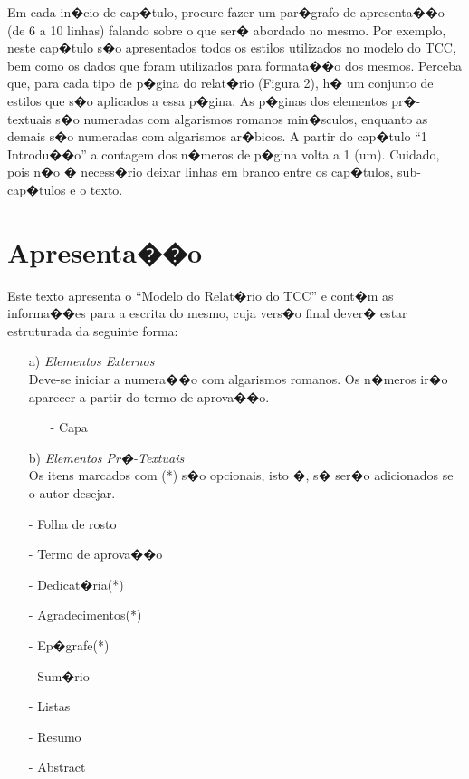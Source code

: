 \documentclass[pnumromarab, normaltoc, a4paper, 12pt]{abnt}
\begin{document}
Em cada in�cio de cap�tulo, procure fazer um par�grafo de apresenta��o (de 6 a
10 linhas) falando sobre o que ser� abordado no mesmo. Por exemplo, neste
cap�tulo s�o apresentados todos os estilos utilizados no modelo do TCC,  bem
como os dados que foram utilizados para formata��o dos mesmos. Perceba que, para
cada tipo de p�gina do relat�rio (Figura 2), h� um conjunto de estilos que s�o
aplicados a essa p�gina. As p�ginas dos elementos pr�-textuais s�o numeradas com
algarismos romanos min�sculos, enquanto as demais s�o numeradas com algarismos
ar�bicos. A partir do cap�tulo ``1 Introdu��o'' a contagem dos n�meros de p�gina
volta a 1 (um). Cuidado, pois n�o � necess�rio deixar linhas em branco entre os
cap�tulos, sub-cap�tulos e o texto.

\section{Apresenta��o}
Este texto apresenta o ``Modelo do Relat�rio do TCC'' e cont�m as informa��es
para a escrita do mesmo, cuja vers�o final dever� estar estruturada da seguinte
forma:

\begin{itemize}
  \leading{5mm}
  \item [a)] \emph{Elementos Externos} \\ Deve-se iniciar a numera��o com
algarismos romanos. Os n�meros ir�o aparecer
a partir do termo de aprova��o.
  \begin{itemize}
    \item [-] Capa
  \end{itemize}
\end{itemize}

\begin{itemize}
  \leading{5mm}
  \item [b)] \emph{ Elementos Pr�-Textuais} \\
  Os itens marcados com (*) s�o opcionais, isto �, s� ser�o adicionados se o
  autor desejar.
  \item [-] Folha de rosto
  \item [-] Termo de aprova��o
  \item [-] Dedicat�ria(*)
  \item [-] Agradecimentos(*)
  \item [-] Ep�grafe(*)
  \item [-] Sum�rio
  \item [-] Listas
  \item [-] Resumo
  \item [-] Abstract
\end{itemize}
\end{document}
